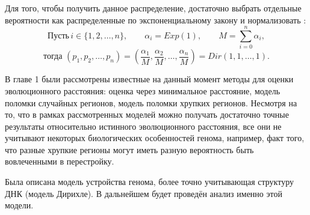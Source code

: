 Для того, чтобы получить данное распределение, достаточно выбрать отдельные вероятности как распределенные по экспоненциальному закону и нормализовать \cite{generation}:
$$\text{Пусть} \, i \in \{1, 2, \ldots, n\}, \qquad \alpha_i = Exp(1), \qquad M = \sum_{i=0}^n \alpha_i,$$
$$\text{тогда} \,\, (p_1, p_2, \ldots, p_n) 
= \left(\frac {\alpha_1} M, \frac {\alpha_2} M, \ldots, \frac {\alpha_n} M\right) 
= Dir(1, 1, \ldots, 1).$$

\chapterconclusion
В главе 1 были рассмотрены известные на данный момент методы для оценки эволюционного расстояния: оценка через минимальное расстояние, модель поломки случайных регионов, модель поломки хрупких регионов. Несмотря на то, что в рамках рассмотренных моделей можно получать достаточно точные результаты относительно истинного эволюционного расстояния, все они не учитывают некоторых биологических особенностей генома, например, факт того, что разные хрупкие регионы могут иметь разную вероятность быть вовлеченными в перестройку.

Была описана модель устройства генома, более точно учитывающая структуру ДНК (модель Дирихле). В дальнейшем будет проведён анализ именно этой модели.